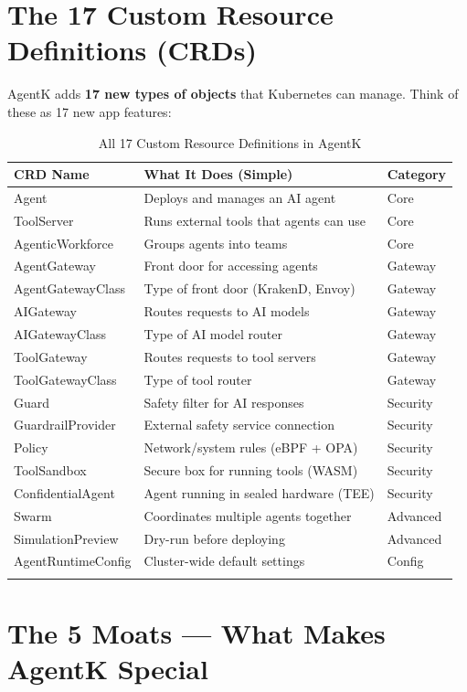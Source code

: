 \documentclass[12pt,a4paper,openany]{report}
\begin{document}
\section{The 17 Custom Resource Definitions (CRDs)}

AgentK adds \textbf{17 new types of objects} that Kubernetes can manage. Think of these as 17 new app features:

\begin{longtable}{p{4cm}p{8cm}p{2cm}}
\toprule
\textbf{CRD Name} & \textbf{What It Does (Simple)} & \textbf{Category} \\
\midrule
\endhead
Agent & Deploys and manages an AI agent & Core \\
ToolServer & Runs external tools that agents can use & Core \\
AgenticWorkforce & Groups agents into teams & Core \\
\midrule
AgentGateway & Front door for accessing agents & Gateway \\
AgentGatewayClass & Type of front door (KrakenD, Envoy) & Gateway \\
AIGateway & Routes requests to AI models & Gateway \\
AIGatewayClass & Type of AI model router & Gateway \\
ToolGateway & Routes requests to tool servers & Gateway \\
ToolGatewayClass & Type of tool router & Gateway \\
\midrule
Guard & Safety filter for AI responses & Security \\
GuardrailProvider & External safety service connection & Security \\
Policy & Network/system rules (eBPF + OPA) & Security \\
ToolSandbox & Secure box for running tools (WASM) & Security \\
ConfidentialAgent & Agent running in sealed hardware (TEE) & Security \\
\midrule
Swarm & Coordinates multiple agents together & Advanced \\
SimulationPreview & Dry-run before deploying & Advanced \\
AgentRuntimeConfig & Cluster-wide default settings & Config \\
\bottomrule
\caption{All 17 Custom Resource Definitions in AgentK}
\end{longtable}

\section{The 5 Moats — What Makes AgentK Special}
\end{document}
